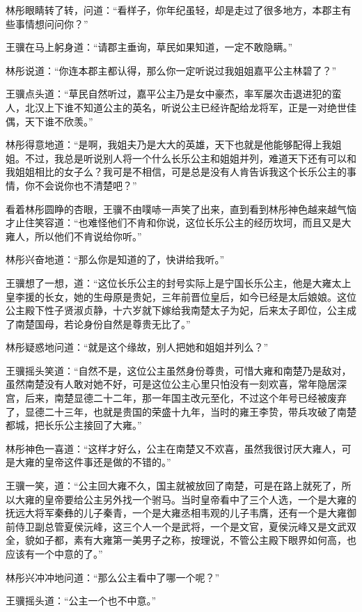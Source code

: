 林彤眼睛转了转，问道：“看样子，你年纪虽轻，却是走过了很多地方，本郡主有些事情想问问你？”

王骥在马上躬身道：“请郡主垂询，草民如果知道，一定不敢隐瞒。”

林彤说道：“你连本郡主都认得，那么你一定听说过我姐姐嘉平公主林碧了？”

王骥点头道：“草民自然听过，嘉平公主乃是女中豪杰，率军屡次击退进犯的蛮人，北汉上下谁不知道公主的英名，听说公主已经许配给龙将军，正是一对绝世佳偶，天下谁不欣羡。”

林彤得意地道：“是啊，我姐夫乃是大大的英雄，天下也就是他能够配得上我姐姐。不过，我总是听说别人将一个什么长乐公主和姐姐并列，难道天下还有可以和我姐姐相比的女子么？我可是不相信，可是总是没有人肯告诉我这个长乐公主的事情，你不会说你也不清楚吧？”

看着林彤圆睁的杏眼，王骥不由噗哧一声笑了出来，直到看到林彤神色越来越气恼才止住笑容道：“也难怪他们不肯和你说，这位长乐公主的经历坎坷，而且又是大雍人，所以他们不肯说给你听。”

林彤兴奋地道：“那么你是知道的了，快讲给我听。”

王骥想了一想，道：“这位长乐公主的封号实际上是宁国长乐公主，他是大雍太上皇李援的长女，她的生母原是贵妃，三年前晋位皇后，如今已经是太后娘娘。这位公主殿下性子贤淑贞静，十六岁就下嫁给我南楚太子为妃，后来太子即位，公主成了南楚国母，若论身份自然是尊贵无比了。”

林彤疑惑地问道：“就是这个缘故，别人把她和姐姐并列么？”

王骥摇头笑道：“自然不是，这位公主虽然身份尊贵，可惜大雍和南楚乃是敌对，虽然南楚没有人敢对她不好，可是这位公主心里只怕没有一刻欢喜，常年隐居深宫，后来，南楚显德二十二年，那一年国主改元至化，不过这个年号已经被废弃了，显德二十三年，也就是贵国的荣盛十九年，当时的雍王李贽，带兵攻破了南楚都城，把长乐公主接回了大雍。”

林彤神色一喜道：“这样才好么，公主在南楚又不欢喜，虽然我很讨厌大雍人，可是大雍的皇帝这件事还是做的不错的。”

王骥一笑，道：“公主回大雍不久，国主就被放回了南楚，可是在路上就死了，所以大雍的皇帝要给公主另外找一个驸马。当时皇帝看中了三个人选，一个是大雍的抚远大将军秦彝的儿子秦青，一个是大雍丞相韦观的儿子韦膺，还有一个是大雍御前侍卫副总管夏侯沅峰，这三个人一个是武将，一个是文官，夏侯沅峰又是文武双全，貌如子都，素有大雍第一美男子之称，按理说，不管公主殿下眼界如何高，也应该有一个中意的了。”

林彤兴冲冲地问道：“那么公主看中了哪一个呢？”

王骥摇头道：“公主一个也不中意。”

